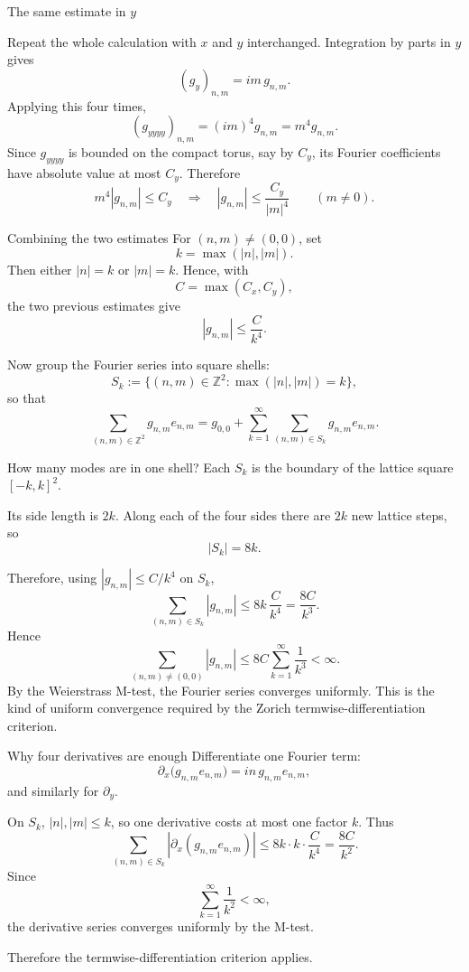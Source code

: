 \documentclass[aspectratio=169,11pt]{beamer}
\begin{document}
\begin{frame}{The same estimate in $y$}
\setlength{\abovedisplayskip}{5pt}
\setlength{\belowdisplayskip}{5pt}

Repeat the whole calculation with $x$ and $y$ interchanged.
Integration by parts in $y$ gives
\[
(g_y)_{n,m}=im\,g_{n,m}.
\]
Applying this four times,
\[
\boxed{(g_{yyyy})_{n,m}=(im)^4g_{n,m}=m^4g_{n,m}.}
\]
Since $g_{yyyy}$ is bounded on the compact torus, say by $C_y$,
its Fourier coefficients have absolute value at most $C_y$. Therefore
\[
m^4|g_{n,m}|\le C_y
\quad\Longrightarrow\quad
\boxed{|g_{n,m}|\le\frac{C_y}{|m|^4}\qquad(m\ne0).}
\]
\end{frame}

\begin{frame}{Combining the two estimates}
For $(n,m)\ne(0,0)$, set
\[
k=\max(|n|,|m|).
\]
Then either $|n|=k$ or $|m|=k$. Hence, with
\[
C=\max(C_x,C_y),
\]
the two previous estimates give
\[
\boxed{|g_{n,m}|\le \frac{C}{k^4}.}
\]

Now group the Fourier series into square shells:
\[
S_k:=\{(n,m)\in\mathbb Z^2:\max(|n|,|m|)=k\},
\]
so that
\[
\sum_{(n,m)\in\mathbb Z^2}g_{n,m}e_{n,m}
=
g_{0,0}
+\sum_{k=1}^{\infty}
\sum_{(n,m)\in S_k}g_{n,m}e_{n,m}.
\]
\end{frame}

\begin{frame}{How many modes are in one shell?}
Each $S_k$ is the boundary of the lattice square $[-k,k]^2$.

Its side length is $2k$. Along each of the four sides there are
$2k$ new lattice steps, so
\[
\boxed{|S_k|=8k.}
\]

Therefore, using $|g_{n,m}|\le C/k^4$ on $S_k$,
\[
\sum_{(n,m)\in S_k}|g_{n,m}|
\le 8k\,\frac{C}{k^4}
=\frac{8C}{k^3}.
\]
Hence
\[
\sum_{(n,m)\ne(0,0)}|g_{n,m}|
\le 8C\sum_{k=1}^{\infty}\frac1{k^3}<\infty.
\]
By the Weierstrass M-test, the Fourier series converges uniformly.
This is the kind of uniform convergence required by the Zorich
termwise-differentiation criterion.
\end{frame}





\begin{frame}{Why four derivatives are enough}
Differentiate one Fourier term:
\[
\partial_x\bigl(g_{n,m}e_{n,m}\bigr)
=in\,g_{n,m}e_{n,m},
\]
and similarly for $\partial_y$.

On $S_k$, $|n|,|m|\le k$, so one derivative costs at most one factor $k$.
Thus
\[
\sum_{(n,m)\in S_k}
|\partial_x(g_{n,m}e_{n,m})|
\le
8k\cdot k\cdot\frac{C}{k^4}
=
\frac{8C}{k^2}.
\]
Since
\[
\sum_{k=1}^{\infty}\frac1{k^2}<\infty,
\]
the derivative series converges uniformly by the M-test.

Therefore the termwise-differentiation criterion applies.
\end{frame}
\end{document}
